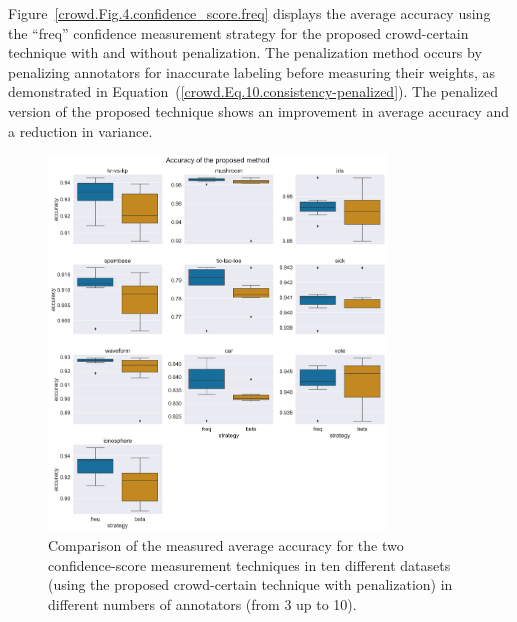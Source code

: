 \documentclass[pdflatex,bst/sn-basic]{bst/sn-jnl}%
\begin{document}
Figure~\ref{crowd.Fig.4.confidence_score.freq} displays the average accuracy using the ``freq'' confidence measurement strategy for the proposed crowd-certain technique with and without penalization. The penalization method occurs by penalizing annotators for inaccurate labeling before measuring their weights, as demonstrated in Equation~(\ref{crowd.Eq.10.consistency-penalized}). The penalized version of the proposed technique shows an improvement in average accuracy and a reduction in variance.

\begin{figure}[!htbp]
\centering
\includegraphics[width=0.8\textwidth]{figures/image2.png}
\caption{Comparison of the measured average accuracy for the two confidence-score measurement techniques in ten different datasets (using the proposed crowd-certain technique with penalization) in different numbers of annotators (from 3 up to 10).}
\label{crowd.Fig.2.confidence_scores}
\end{figure}
\end{document}
